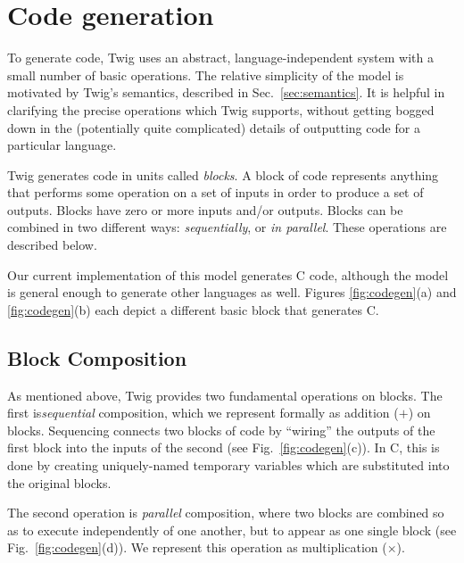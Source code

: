 
\section{Code generation}
\label{sec:code-gen}

To generate code, Twig uses an abstract, language-independent system with a small number of basic operations. The relative simplicity of the model is motivated by Twig's semantics, described in Sec.~\ref{sec:semantics}. It is helpful in clarifying the precise operations which Twig supports, without getting bogged down in the (potentially quite complicated) details of outputting code for a particular language.

Twig generates code in units called \emph{blocks}. A block of code represents anything that performs some operation on a set of inputs in order to produce a set of outputs. Blocks have zero or more inputs and/or outputs. Blocks can be combined in two different ways: \emph{sequentially}, or \emph{in parallel}. These operations are described below.

Our current implementation of this model generates C code, although the model is general enough to generate other languages as well. Figures \ref{fig:codegen}(a) and \ref{fig:codegen}(b) each depict a different basic block that generates C.

\subsection{Block Composition}

As mentioned above, Twig provides two fundamental operations on blocks. The first is\emph{sequential} composition, which we represent formally as addition ($+$) on blocks. Sequencing connects two blocks of code by ``wiring'' the outputs of the first block into the inputs of the second (see Fig.~\ref{fig:codegen}(c)). In C, this is done by creating uniquely-named temporary variables which are substituted into the original blocks.

The second operation is \emph{parallel} composition, where two blocks are combined so as to execute independently of one another, but to appear as one single block (see Fig.~\ref{fig:codegen}(d)). We represent this operation as multiplication ($\times$).


